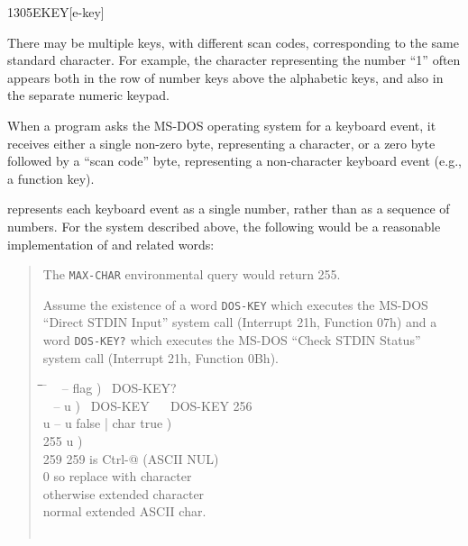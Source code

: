 \begin{worddef}{1305}{EKEY}[e-key]
\begin{defer}
		There may be multiple keys, with different scan codes,
		corresponding to the same standard character. For example,
		the character representing the number ``1'' often appears both
		in the row of number keys above the alphabetic keys, and also
		in the separate numeric keypad.

		When a program asks the MS-DOS operating system for a keyboard
		event, it receives either a single non-zero byte, representing
		a character, or a zero byte followed by a ``scan code'' byte,
		representing a non-character keyboard event (e.g., a function
		key).

		 represents each keyboard event as a single number,
		rather than as a sequence of numbers. For the system described
		above, the following would be a reasonable implementation of
		 and related words:

		\begin{quote}
			The \texttt{MAX-CHAR} environmental query would return 255.

			Assume the existence of a word
			\texttt{DOS-KEY} 
			which executes the MS-DOS ``Direct STDIN Input'' system call
			(Interrupt 21h, Function 07h) and a word
			\texttt{DOS-KEY?} 
			which executes the MS-DOS ``Check STDIN Status'' system call
			(Interrupt 21h, Function 0Bh).

			\ttfamily
			\begin{tabbing}
			\tab \= \tab \= \tab \= \tab \= \hspace{7em} \= \kill
			\word{:} ~  -- flag )~
				DOS-KEY?~  \word{;} \\[\parskip]

			\word{:} ~  -- u )~
				DOS-KEY~   ~
					DOS-KEY 256 \word{+}~  \word{;} \\[\parskip]

			\+ \word{:}   u -- u false | char true ) \\
				\+  255   		\>\>\>\>	\word{p} u ) \\
					 259 \word{=}  		\>\>\>		 259 is Ctrl-@ (ASCII NUL) \\
					\>  0  \>\>		 so replace with character \\
				\-   		\>\>\>		 otherwise extended character \\
			\-  						\>\>\>\>	 normal extended ASCII char. \\
			\word{;} \\[\parskip]


\end{tabbing}
\end{quote}
\end{defer}
\end{worddef}
